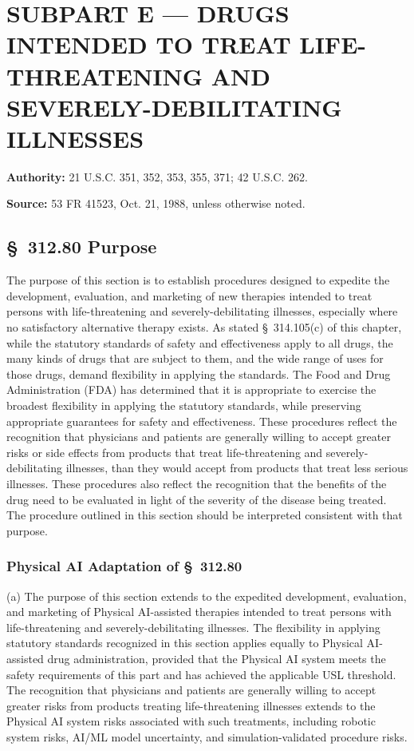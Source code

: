 \clearpage

\section{SUBPART E --- DRUGS INTENDED TO TREAT LIFE-THREATENING AND SEVERELY-DEBILITATING ILLNESSES}

\textbf{Authority:} 21 U.S.C. 351, 352, 353, 355, 371; 42 U.S.C. 262.

\textbf{Source:} 53 FR 41523, Oct. 21, 1988, unless otherwise noted.

\subsection{\S~312.80 Purpose}

The purpose of this section is to establish procedures designed to expedite the development, evaluation, and marketing of new therapies intended to treat persons with life-threatening and severely-debilitating illnesses, especially where no satisfactory alternative therapy exists. As stated \S~314.105(c) of this chapter, while the statutory standards of safety and effectiveness apply to all drugs, the many kinds of drugs that are subject to them, and the wide range of uses for those drugs, demand flexibility in applying the standards. The Food and Drug Administration (FDA) has determined that it is appropriate to exercise the broadest flexibility in applying the statutory standards, while preserving appropriate guarantees for safety and effectiveness. These procedures reflect the recognition that physicians and patients are generally willing to accept greater risks or side effects from products that treat life-threatening and severely-debilitating illnesses, than they would accept from products that treat less serious illnesses. These procedures also reflect the recognition that the benefits of the drug need to be evaluated in light of the severity of the disease being treated. The procedure outlined in this section should be interpreted consistent with that purpose.

\subsubsection{Physical AI Adaptation of \S~312.80}

(a) The purpose of this section extends to the expedited development, evaluation, and marketing of Physical AI-assisted therapies intended to treat persons with life-threatening and severely-debilitating illnesses. The flexibility in applying statutory standards recognized in this section applies equally to Physical AI-assisted drug administration, provided that the Physical AI system meets the safety requirements of this part and has achieved the applicable USL threshold. The recognition that physicians and patients are generally willing to accept greater risks from products treating life-threatening illnesses extends to the Physical AI system risks associated with such treatments, including robotic system risks, AI/ML model uncertainty, and simulation-validated procedure risks.


